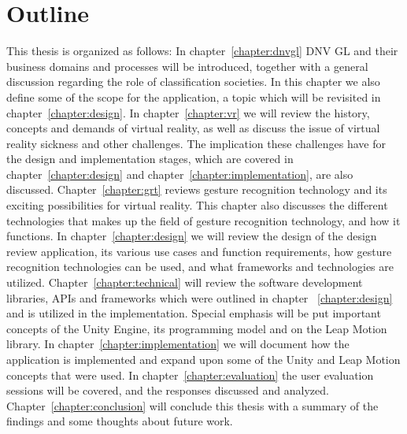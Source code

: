 \section{Outline}
This thesis is organized as follows: In chapter~\ref{chapter:dnvgl} DNV GL and their business domains and processes will be introduced, together with a general discussion regarding
the role of classification societies. In this chapter we also define some of the scope for the application, a topic which will be revisited in 
chapter~\ref{chapter:design}. In chapter~\ref{chapter:vr} we will review the history, concepts and demands of virtual reality, as well as discuss the issue of virtual reality
sickness and other challenges. The implication these challenges have for the design and implementation stages, which are covered in chapter~\ref{chapter:design} and
chapter~\ref{chapter:implementation}, are also discussed. Chapter~\ref{chapter:grt} reviews gesture recognition technology and its exciting possibilities for virtual reality.
This chapter also discusses the different technologies that makes up the field of gesture recognition technology, and how it functions. 
In chapter~\ref{chapter:design} we will review the design of the design review application, its various use cases and function requirements, how gesture recognition technologies
can be used, and what frameworks and technologies are utilized. Chapter~\ref{chapter:technical} will review the software development libraries, APIs and frameworks
which were outlined in chapter ~\ref{chapter:design} and is utilized in the implementation. Special emphasis will be put important concepts of the Unity Engine, its programming model
and on the Leap Motion library.  
In chapter~\ref{chapter:implementation} we will document how the application is implemented and expand upon some of the Unity and Leap Motion concepts that were used.
In chapter~\ref{chapter:evaluation} the user evaluation sessions will be covered, and the responses discussed and analyzed.
Chapter~\ref{chapter:conclusion} will conclude this thesis with a summary of the findings and some thoughts about future work.


